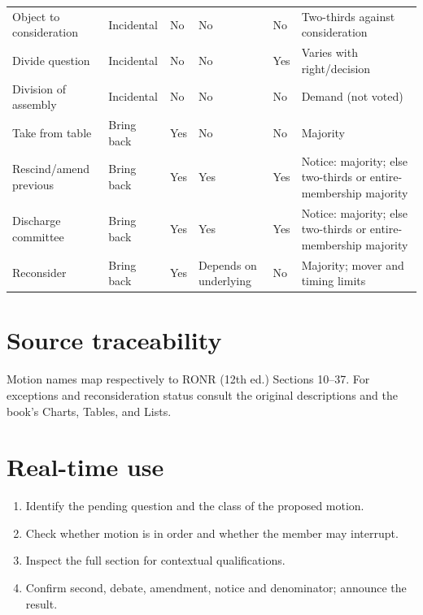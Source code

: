 \documentclass[11pt]{article}
\begin{document}
\begin{longtable}{@{}p{.21\linewidth}p{.13\linewidth}p{.07\linewidth}p{.14\linewidth}p{.08\linewidth}p{.23\linewidth}@{}}
Object to consideration & Incidental & No & No & No & Two-thirds against consideration\\
Divide question & Incidental & No & No & Yes & Varies with right/decision\\
Division of assembly & Incidental & No & No & No & Demand (not voted)\\
Take from table & Bring back & Yes & No & No & Majority\\
Rescind/amend previous & Bring back & Yes & Yes & Yes & Notice: majority; else two-thirds or entire-membership majority\\
Discharge committee & Bring back & Yes & Yes & Yes & Notice: majority; else two-thirds or entire-membership majority\\
Reconsider & Bring back & Yes & Depends on underlying & No & Majority; mover and timing limits\\
\bottomrule\end{longtable}\normalsize
\section{Source traceability}
Motion names map respectively to RONR (12th ed.) Sections 10--37. For exceptions and reconsideration status consult the original descriptions and the book’s Charts, Tables, and Lists.
\section{Real-time use}
\begin{enumerate}[leftmargin=*,itemsep=4pt]
\item Identify the pending question and the class of the proposed motion.
\item Check whether motion is in order and whether the member may interrupt.
\item Inspect the full section for contextual qualifications.
\item Confirm second, debate, amendment, notice and denominator; announce the result.
\end{enumerate}
\end{document}
